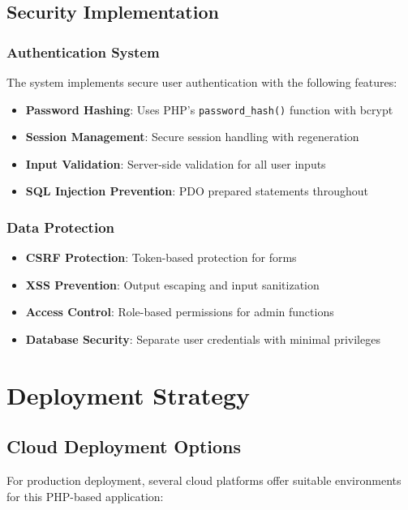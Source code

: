 \documentclass[12pt,a4paper]{article}
\begin{document}
\subsection{Security Implementation}

\subsubsection{Authentication System}
The system implements secure user authentication with the following features:

\begin{itemize}
    \item \textbf{Password Hashing}: Uses PHP's \texttt{password\_hash()} function with bcrypt
    \item \textbf{Session Management}: Secure session handling with regeneration
    \item \textbf{Input Validation}: Server-side validation for all user inputs
    \item \textbf{SQL Injection Prevention}: PDO prepared statements throughout
\end{itemize}

\subsubsection{Data Protection}
\begin{itemize}
    \item \textbf{CSRF Protection}: Token-based protection for forms
    \item \textbf{XSS Prevention}: Output escaping and input sanitization
    \item \textbf{Access Control}: Role-based permissions for admin functions
    \item \textbf{Database Security}: Separate user credentials with minimal privileges
\end{itemize}

\section{Deployment Strategy}

\subsection{Cloud Deployment Options}

For production deployment, several cloud platforms offer suitable environments for this PHP-based application:
\end{document}

